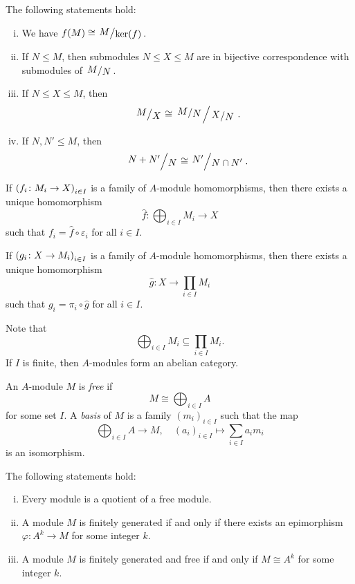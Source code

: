 \begin{izrek}
The following statements hold:

\begin{enumerate}[i)]
\item We have $f(M) \cong \kvoc{M}{\ker(f)}$.
\item If $N \leq M$, then submodules $N \leq X \leq M$ are in
bijective correspondence with submodules of $\kvoc{M}{N}$.
\item If $N \leq X \leq M$, then
\[
\kvoc{M}{X} \cong \kvoc{\kvoc{M}{N}}{\kvoc{X}{N}}.
\]
\item If $N, N' \leq M$, then
\[
\kvoc{N+N'}{N} \cong \kvoc{N'}{N \cap N'}.
\]
\end{enumerate}
\end{izrek}

\begin{izrek}
If $\left(f_i \colon M_i \to X\right)_{i \in I}$ is a family of $A$-module
homomorphisms, then there exists a unique homomorphism
\[
\hat{f} \colon \bigoplus_{i \in I} M_i \to X
\]
such that $f_i = \hat{f} \circ \varepsilon_i$ for all $i \in I$.

If $\left(g_i \colon X \to M_i\right)_{i \in I}$ is a family of $A$-module
homomorphisms, then there exists a unique homomorphism
\[
\hat{g} \colon X \to \prod_{i \in I} M_i
\]
such that $g_i = \pi_i \circ \hat{g}$ for all $i \in I$.
\end{izrek}


\begin{opomba}
Note that
\[
\bigoplus_{i \in I} M_i \subseteq \prod_{i \in I} M_i.
\]
If $I$ is finite, then $A$-modules form an abelian category.
\end{opomba}

\begin{definicija}
An $A$-module $M$ is \emph{free} if
\[
M \cong \bigoplus_{i \in I} A
\]
for some set $I$. A \emph{basis} of $M$ is a family
$(m_i)_{i \in I}$ such that the map
\[
\bigoplus_{i \in I} A \to M, \quad
(a_i)_{i \in I} \mapsto \sum_{i \in I} a_i m_i
\]
is an isomorphism.
\end{definicija}

\begin{lema}
The following statements hold:

\begin{enumerate}[i)]
\item Every module is a quotient of a free module.
\item A module $M$ is finitely generated if and only if there
exists an epimorphism $\varphi \colon A^k \to M$ for some integer
$k$.
\item A module $M$ is finitely generated and free if and only if
$M \cong A^k$ for some integer $k$.
\end{enumerate}
\end{lema}

